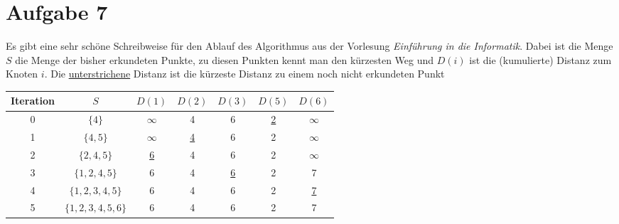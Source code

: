 \documentclass{article}
\begin{document}
	\section*{Aufgabe 7}
	Es gibt eine sehr schöne Schreibweise für den Ablauf des Algorithmus aus der Vorlesung \textit{Einführung in die Informatik}. Dabei ist die Menge $S$ die Menge der bisher erkundeten Punkte, zu diesen Punkten kennt man den kürzesten Weg und $D(i)$ ist die (kumulierte) Distanz zum Knoten $i$. Die \underline{unterstrichene} Distanz ist die kürzeste Distanz zu einem noch nicht erkundeten Punkt
	\begin{center}
		\begin{tabular}{c|c|ccccc}
			Iteration & $S$ & $D(1)$ & $D(2)$ & $D(3)$ & $D(5)$ & $D(6)$ \\
			\hline
			0 & $\{4\}$ & $\infty$ & 4 & 6 & \underline{2} & $\infty$ \\
			1 & $\{4,5\}$ & $\infty$ & \underline{4} & 6 & 2 & $\infty$ \\
			2 & $\{2,4,5\}$ & \underline{6} & 4 & 6 & 2 & $\infty$ \\
			3 & $\{1,2,4,5\}$ & 6 & 4 & \underline{6} & 2 & 7 \\
			4 & $\{1,2,3,4,5\}$ & 6 & 4 & 6 & 2 & \underline{7} \\
			5 & $\{1,2,3,4,5,6\}$ & 6 & 4 & 6 & 2 & 7
		\end{tabular}
	\end{center}
	
\end{document}
